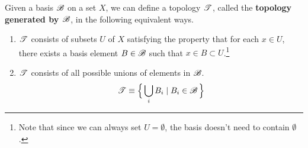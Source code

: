   \begin{theorem}
    Given a basis $\operatorname{\mathscr{B}}$ on a set $X$, we can define a topology $\operatorname{\mathscr{T}}$, called the \textbf{topology generated by $\operatorname{\mathscr{B}}$}, in the following equivalent ways. 
    \begin{enumerate}
      \item $\operatorname{\mathscr{T}}$ consists of subsets $U$ of $X$ satisfying the property that for each $x \in U$, there exists a basis element $B \in \operatorname{\mathscr{B}}$ such that $x \in B \subset U$.\footnote{Note that since we can always set $U = \emptyset$, the basis doesn't need to contain $\emptyset$. }
      \begin{center}
      \end{center}

      \item $\operatorname{\mathscr{T}}$ consists of all possible unions of elements in $\operatorname{\mathscr{B}}$. 
      \begin{equation}
        \operatorname{\mathscr{T}} \equiv \Big\{ \bigcup_i B_i \mid B_i \in \operatorname{\mathscr{B}}\Big\}
      \end{equation}
    \end{enumerate}
  \end{theorem} 

